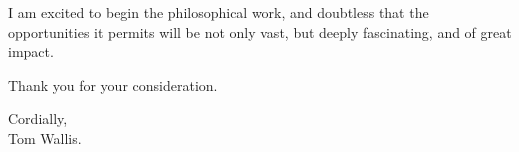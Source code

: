 I am excited to begin the philosophical work, and doubtless that the opportunities it permits will be not only vast, but deeply fascinating, and of great impact.\par\bigskip

Thank you for your consideration.

\bigskip
\begin{flushright}
    Cordially,\\
    Tom Wallis.
\end{flushright}




